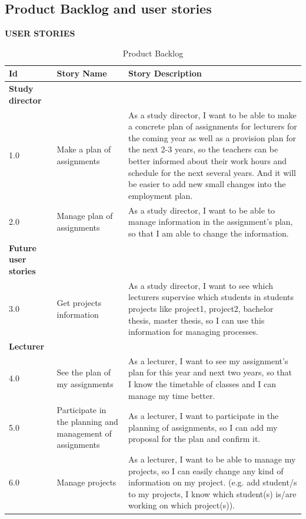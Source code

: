 \documentclass{scrartcl}
\begin{document}
 \subsection{Product Backlog and user stories}
    \begin{table}[H]
	\begin{center}
	\textbf{USER STORIES }\\[1cm]
	\begin{tabular}{| p{2.5cm}| p{4cm} | p{9cm} |}
	\hline
	\textbf{Id} & \textbf{Story Name} & \textbf{Story Description}\\
	\hline      
	\textbf{Study director} \\ \hline
	1.0 & Make a plan of assignments & As a study director, I want to be able to make a concrete plan of assignments for lecturers for the coming year as well as a provision plan for the next 2-3 years, so the teachers can be better informed about their work hours and schedule for the next several years. And it will be easier to add new small changes into the employment plan. \\ \hline
	2.0 & Manage plan of assignments & As a study director, I want to be able to manage information in the assignment's plan, so that I am able to change the information.\\ \hline
	\textbf{Future user stories} \\ \hline
	3.0 & Get projects information & As a study director, I want to see which lecturers supervise which students in students  projects like project1, project2, bachelor thesis, master thesis, so I can use this information for managing processes. \\ \hline
	\textbf{Lecturer} \\ \hline
	4.0 & See the plan of my assignments &  As a lecturer, I want to see my assignment's plan for this year and next two years, so that I know the timetable of classes and I can manage my time better.
\\ \hline
	5.0 & Participate in the planning and management of assignments &   As a lecturer, I want to participate in the planning of assignments, so I can add my proposal for the plan and confirm it.\\ \hline
	6.0 & Manage projects & As a lecturer, I want to be able to manage my projects, so I can easily change any kind of information on my project. (e.g.  add student/s to my projects, I know which student(s) is/are working on which project(s)).\\ \hline
	
     \end{tabular}
	\end{center}
	\caption{Product Backlog}
	\label{table2}
	\end{table}
	
\end{document}
